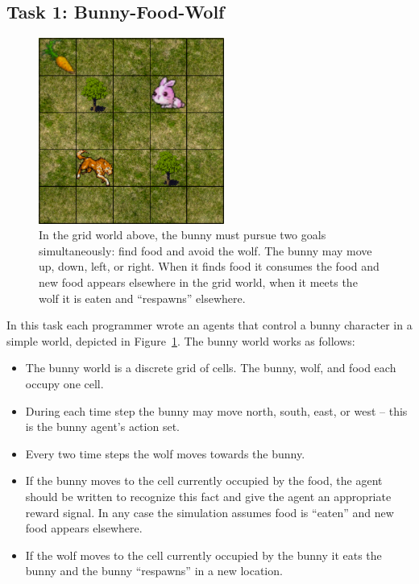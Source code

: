\subsection{Task 1: Bunny-Food-Wolf}\label{sec:task1}

\begin{figure}[h]

\begin{center}
\includegraphics[height=2.4in]{bunny.png}
\end{center}


\caption{In the grid world above, the bunny must pursue two goals simultaneously: find food and avoid the wolf.  The bunny may move up, down, left, or right.  When it finds food it consumes the food and new food appears elsewhere in the grid world, when it meets the wolf it is eaten and ``respawns'' elsewhere.}
\label{fig:bunny-picture}
\end{figure}

In this task each programmer wrote an agents that control a bunny character in a simple world, depicted in Figure~\ref{fig:bunny-picture}.  The bunny world works as follows:

\begin{itemize}

\item The bunny world is a discrete grid of cells.  The bunny, wolf, and food each occupy one cell.

\item During each time step the bunny may move north, south, east, or west -- this is the bunny agent's action set.

\item Every two time steps the wolf moves towards the bunny.

\item If the bunny moves to the cell currently occupied by the food, the agent should be written to recognize this fact and give the agent an appropriate reward signal. In any case the simulation assumes food is ``eaten'' and new food appears elsewhere.

\item If the wolf moves to the cell currently occupied by the bunny it eats the bunny and the bunny ``respawns'' in a new location.

\end{itemize}

